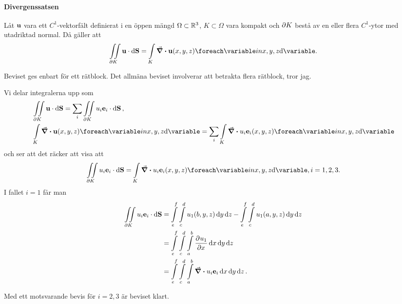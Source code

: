 \paragraph{Divergenssatsen}
Låt $\vect{u}$ vara ett $C^1$-vektorfält definierat i en öppen mängd $\Omega\subset\mathbb{R}^3$, $K\subset\Omega$ vara kompakt och $\partial K$ bestå av en eller flera $C^1$-ytor med utadriktad normal. Då gäller att
\begin{align*}
	\fint{\bound{K}}{\vect{u}}{\vect{S}} = \inteval{K}{\div{\vect{u}}}{{x, y, z}}.
\end{align*}

\proof
Beviset ges enbart för ett rätblock. Det allmäna beviset involverar att betrakta flera rätblock, tror jag.

Vi delar integralerna upp som
\begin{align*}
	&\fint{\bound{K}}{\vect{u}}{\vect{S}} = \sum\limits_{i}\fint{\bound{K}}{u_i\vect{e}_i}{\vect{S}}, \\
	&\inteval{K}{\div{\vect{u}}}{{x, y, z}} = \sum\limits_{i}\inteval{K}{\div{u_i\vect{e}_i}}{{x, y, z}}
\end{align*}
och ser att det räcker att visa att
\begin{align*}
	\fint{\bound{K}}{u_i\vect{e}_i}{\vect{S}} = \inteval{K}{\div{u_i\vect{e}_i}}{{x, y, z}}, i = 1, 2, 3.
\end{align*}
I fallet $i = 1$ får man
\begin{align*}
	\fint{\bound{K}}{u_i\vect{e}_i}{\vect{S}} &= \int\limits_{e}^{f}\int\limits_{c}^{d}u_1(b, y, z)\dd{y}\dd{z} - \int\limits_{e}^{f}\int\limits_{c}^{d}u_1(a, y, z)\dd{y}\dd{z} \\
	                                          &= \int\limits_{e}^{f}\int\limits_{c}^{d}\int\limits_{a}^{b}\pdeval{u_1}{x}{x, y, z}\dd{x}\dd{y}\dd{z}\\
	                                          &= \int\limits_{e}^{f}\int\limits_{c}^{d}\int\limits_{a}^{b}\div{u_i\vect{e}_i}\dd{x}\dd{y}\dd{z}.
\end{align*}

Med ett motsvarande bevis för $i = 2, 3$ är beviset klart.